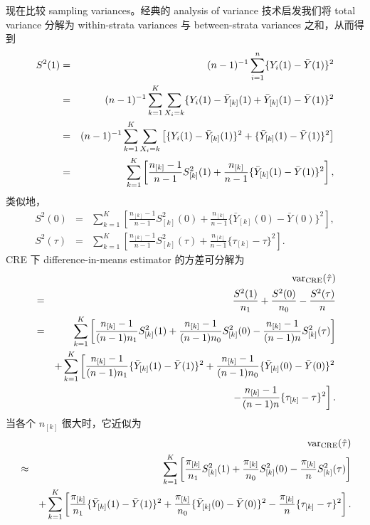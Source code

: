 现在比较 sampling variances。经典的 analysis of variance 技术启发我们将 total variance 分解为 within-strata variances 与 between-strata variances 之和，从而得到
\begin{eqnarray*}
S^2(1) &=&  (n-1)^{-1} \sum_{i=1}^n \{  Y_i(1) - \bar{Y}(1) \}^2 \\
&=& (n-1)^{-1} \sum_{k=1}^K \sum_{X_i   = k} \{ Y_i(1) - \bar{Y}_{[k]}(1)  + \bar{Y}_{[k]}(1)  -   \bar{Y}(1)  \}^2 \\
&=& (n-1)^{-1} \sum_{k=1}^K \sum_{X_i   = k} \left[  \{ Y_i(1) - \bar{Y}_{[k]}(1) \}^2 +  \{ \bar{Y}_{[k]}(1)  -   \bar{Y}(1)  \}^2 \right] \\
&=& \sum_{k=1}^K \left[   \frac{n_{[k]} - 1}{n-1}   S_{[k]}^2(1)  +  \frac{ n_{[k]}}{ n-1} \{ \bar{Y}_{[k]}(1) - \bar{Y}(1) \}^2  \right],
\end{eqnarray*} 
类似地，
\begin{eqnarray*}
S^2(0) &=& \sum_{k=1}^K \left[   \frac{n_{[k]} - 1}{n-1}   S_{[k]}^2(0)  +  \frac{ n_{[k]}}{ n-1} \{ \bar{Y}_{[k]}(0) - \bar{Y}(0) \}^2  \right],\\
S^2(\tau) &=& \sum_{k=1}^K \left[   \frac{n_{[k]} - 1}{n-1}   S_{[k]}^2(\tau)  +  \frac{ n_{[k]}}{ n-1} \{ \tau_{[k]} - \tau \}^2  \right] .
\end{eqnarray*}
CRE 下 difference-in-means estimator 的方差可分解为
\begin{eqnarray*}
&&\textup{var}_{\text{CRE}}(  \hat{\tau} )  \\
&=& \frac{S^2(1)}{ n_{1} } +  \frac{S^2(0)}{ n_{0} }
- \frac{  S^2(\tau) }{ n }  \\ 
&=& \sum_{k=1}^K  \left[   \frac{ n_{[k]} - 1}{(n-1)n_1}  S_{[k]}^2(1) + \frac{ n_{[k]} - 1}{ (n-1)n_0}  S_{[k]}^2(0) -  \frac{ n_{[k]} - 1}{(n-1)n}    S_{[k]}^2(\tau) \right] \\
&&  + \sum_{k=1}^K  \left[    \frac{ n_{[k]} - 1}{ (n-1)n_1}  \{ \bar{Y}_{[k]}(1) - \bar{Y}(1) \}^2 +  \frac{ n_{[k]} - 1}{ (n-1)n_0}  \{ \bar{Y}_{[k]}(0) - \bar{Y}(0) \}^2   \right. \\
&& \left.  - \frac{ n_{[k]} - 1  }{ (n-1)n} \{ \tau_{[k]} - \tau \}^2  \right] .
 \end{eqnarray*}
 当各个 $n_{[k]}$ 很大时，它近似为
 \begin{eqnarray*}
 &&\textup{var}_{\text{CRE}}(  \hat{\tau} )  \\
&\approx & 
\sum_{k=1}^K  \left[   \frac{ \pi_{[k]}}{n_1}  S_{[k]}^2(1) + \frac{ \pi_{[k]}}{n_0}  S_{[k]}^2(0) -  \frac{ \pi_{[k]}}{n}    S_{[k]}^2(\tau) \right] \\
&&  + \sum_{k=1}^K  \left[    \frac{ \pi_{[k]}}{n_1}  \{ \bar{Y}_{[k]}(1) - \bar{Y}(1) \}^2 +  \frac{ \pi_{[k]}}{n_0}  \{ \bar{Y}_{[k]}(0) - \bar{Y}(0) \}^2  
 - \frac{ \pi_{[k]}  }{n} \{ \tau_{[k]} - \tau \}^2  \right] .
\end{eqnarray*}
